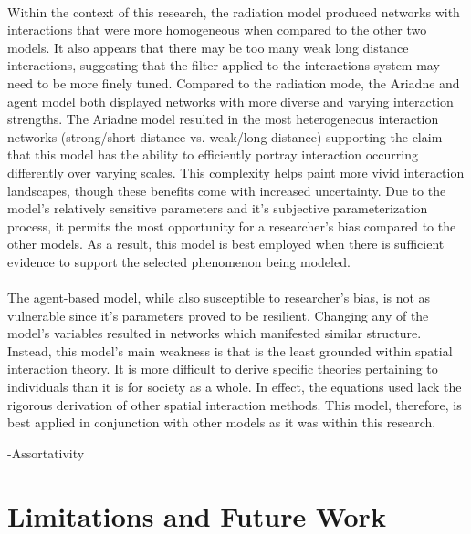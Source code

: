 \documentclass[12pt,a4paper]{thesis}
\begin{document}
\paragraph{{}}
Within the context of this research, the radiation model produced networks with interactions that were more homogeneous when compared to the other two models. It also appears that there may be too many weak long distance interactions, suggesting that the filter applied to the interactions system may need to be more finely tuned. Compared to the radiation mode, the Ariadne and agent model both displayed networks with more diverse and varying interaction strengths. The Ariadne model resulted in the most heterogeneous interaction networks (strong/short-distance vs. weak/long-distance) supporting the claim that this model has the ability to efficiently portray interaction occurring differently over varying scales. This complexity helps paint more vivid interaction landscapes, though these benefits come with increased uncertainty. Due to the model's relatively sensitive parameters and it's subjective parameterization process, it permits the most opportunity for a researcher's bias compared to the other models. As a result, this model is best employed when there is sufficient evidence to support the selected phenomenon being modeled.      

\paragraph{}
The agent-based model, while also susceptible to researcher's bias, is not as vulnerable since it's parameters proved to be resilient. Changing any of the model's variables resulted in networks which manifested similar structure. Instead, this model's main weakness is that is the least grounded within spatial interaction theory. It is more difficult to derive specific theories pertaining to individuals than it is for society as a whole. In effect, the equations used lack the rigorous derivation of other spatial interaction methods. This model, therefore, is best applied in conjunction with other models as it was within this research.   

-Assortativity

\section{Limitations and Future Work}
\end{document}
